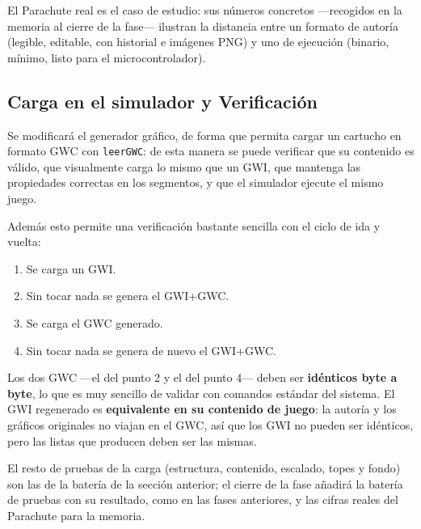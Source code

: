 El Parachute real es el caso de estudio: sus números concretos
—recogidos en la memoria al cierre de la fase— ilustran la
distancia entre un formato de autoría (legible, editable, con
historial e imágenes PNG) y uno de ejecución (binario, mínimo,
listo para el microcontrolador).

\subsection{Carga en el simulador y Verificación}
\label{sec:F5I3Carga}

Se modificará el generador gráfico, de forma que permita cargar un
cartucho en formato GWC con \texttt{leerGWC}: de esta manera se
puede verificar que su contenido es válido, que visualmente carga
lo mismo que un GWI, que mantenga las propiedades correctas en los
segmentos, y que el simulador ejecute el mismo juego.

Además esto permite una verificación bastante sencilla con el ciclo
de ida y vuelta:

\begin{enumerate}
	\item Se carga un GWI.
	\item Sin tocar nada se genera el GWI+GWC.
	\item Se carga el GWC generado.
	\item Sin tocar nada se genera de nuevo el GWI+GWC.
\end{enumerate}

Los dos GWC —el del punto 2 y el del punto 4— deben ser
\textbf{idénticos byte a byte}, lo que es muy sencillo de validar
con comandos estándar del sistema. El GWI regenerado es
\textbf{equivalente en su contenido de juego}: la autoría y los
gráficos originales no viajan en el GWC, así que los GWI no pueden
ser idénticos, pero las listas que producen deben ser las mismas.

El resto de pruebas de la carga (estructura, contenido, escalado,
topes y fondo) son las de la batería de la sección anterior; el
cierre de la fase añadirá la batería de pruebas con su resultado,
como en las fases anteriores, y las cifras reales del Parachute
para la memoria.